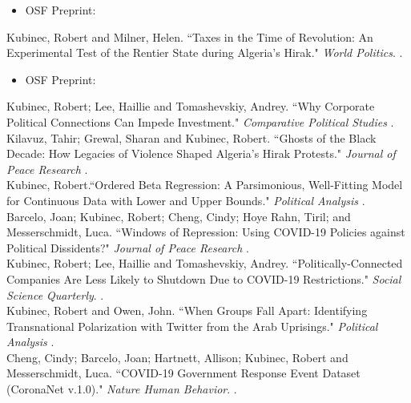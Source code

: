\documentclass[11pt, a4paper]{article}
\newcommand{\years}[1]{\marginnote{\scriptsize #1}}
\begin{document}
\begin{itemize}
	\item OSF Preprint: 
\end{itemize}

\years{2023} Kubinec, Robert and Milner, Helen. ``Taxes in the Time of Revolution: An Experimental Test of the Rentier State during Algeria's Hirak." \emph{World Politics}. .

\begin{itemize}
	\item OSF Preprint: 
\end{itemize}

\years{2023} Kubinec, Robert; Lee, Haillie and Tomashevskiy, Andrey. ``Why Corporate Political Connections Can Impede Investment." \emph{Comparative Political Studies} .\\

\years{2022} Kilavuz, Tahir; Grewal, Sharan and Kubinec, Robert. ``Ghosts of the Black Decade: How Legacies of Violence Shaped Algeria's Hirak Protests." \emph{Journal of Peace Research} .\\

\years{2022}  Kubinec, Robert.``Ordered Beta Regression: A Parsimonious, Well-Fitting Model for Continuous Data with Lower and Upper Bounds." \textit{Political Analysis} .\\

\years{2022}Barcelo, Joan; Kubinec, Robert; Cheng, Cindy; Hoye Rahn, Tiril; and Messerschmidt, Luca. ``Windows of Repression: Using COVID-19 Policies against Political Dissidents?"  \textit{Journal of Peace Research} .\\

\years{2021}Kubinec, Robert; Lee, Haillie and Tomashevskiy, Andrey. ``Politically-Connected Companies Are Less Likely to Shutdown Due to COVID-19 Restrictions." \textit{Social Science Quarterly}. .\\

\years{2020}Kubinec, Robert and Owen, John. ``When Groups Fall Apart: Identifying Transnational Polarization with Twitter from the Arab Uprisings." \textit{Political Analysis} . \\

\years{2020}Cheng, Cindy; Barcelo, Joan; Hartnett, Allison; Kubinec, Robert and Messerschmidt, Luca. ``COVID-19 Government Response Event Dataset (CoronaNet v.1.0)." \textit{Nature Human Behavior}. .\\
\end{document}
